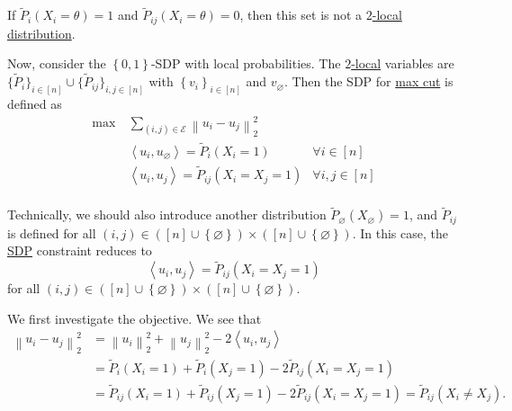 \begin{eg}
	If \(\widetilde{P} _i (X_i = \theta ) = 1\) and \(\widetilde{P} _{ij}(X_i = \theta ) = 0\), then this set is not a \hyperref[def:2-local-distribution]{\(2\)-local distribution}.
\end{eg}

Now, consider the \(\left\{ 0, 1 \right\} \)-SDP with local probabilities. The \hyperref[def:2-local-distribution]{\(2\)-local} variables are \(\{ \widetilde{P} _i \} _{i\in [n]} \cup  \{ \widetilde{P} _{ij} \}_{i, j\in [n]} \) with \(\left\{ v_i \right\} _{i\in [n]}\) and \(v_\varnothing \). Then the SDP for \hyperref[prb:max-cut]{max cut} is defined as
\[
	\begin{aligned}
		\max~ & \sum_{(i, j)\in \mathcal{E} }\left\lVert u_i - u_j\right\rVert _2^2                              \\
		      & \left\langle u_i, u_\varnothing  \right\rangle = \widetilde{P} _i(X_i = 1) & \forall i\in [n]    \\
		      & \left\langle u_i, u_j  \right\rangle = \widetilde{P} _{ij}(X_i = X_j = 1)  & \forall i, j\in [n] \\
	\end{aligned}
\]

\begin{remark}
	Technically, we should also introduce another distribution \(\widetilde{P} _{\varnothing }(X_\varnothing) = 1\), and \(\widetilde{P} _{ij}\) is defined for all \((i, j)\in ([n]\cup \left\{ \varnothing  \right\} )\times ([n]\cup \left\{ \varnothing  \right\} )\). In this case, the \hyperref[def:SDP]{SDP} constraint reduces to
	\[
		\left\langle  u_i, u_j \right\rangle = \widetilde{P} _{ij}(X_{i} = X_{j} =1)
	\]
	for all \((i, j)\in ([n]\cup \left\{ \varnothing  \right\} )\times ([n]\cup \left\{ \varnothing \right\} )\).
\end{remark}

We first investigate the objective. We see that
\[
	\begin{split}
		\left\lVert u_i - u_j\right\rVert _2^2
		&= \left\lVert u_i\right\rVert _2^2 + \left\lVert u_j\right\rVert _2^2 - 2\left\langle u_{i} , u_{j}  \right\rangle \\
		&= \widetilde{P} _i(X_i = 1)+ \widetilde{P} _i(X_j = 1) - 2 \widetilde{P} _{ij} ( X_i = X_j = 1)\\
		&= \widetilde{P} _{ij}(X_i = 1)+ \widetilde{P} _{ij}(X_j = 1) - 2 \widetilde{P} _{ij} ( X_i = X_j = 1)
		= \widetilde{P} _{ij} ( X_i \neq X_j).
	\end{split}
\]

